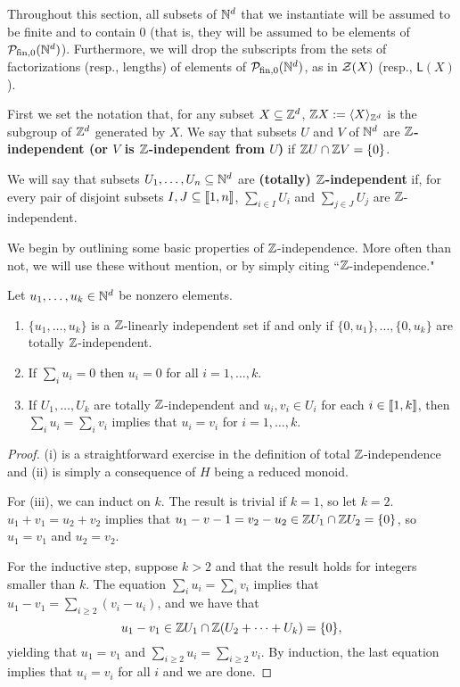 Throughout this section, all subsets of $\mathbb{N}^d$ that we instantiate will be assumed to be finite and to contain $0$ (that is, they will be assumed to be elements of $\mathcal{P}_{\textrm{fin}, 0}(\mathbb{N}^d)$).
Furthermore, we will drop the subscripts from the sets of factorizations (resp., lengths) of elements of $\mathcal{P}_{\textrm{fin}, 0}(\mathbb{N}^d)$, as in $\mathcal{Z}(X)$ (resp., $\mathsf{L}(X)$).

\begin{defn}
First we set the notation that, for any subset $X \subseteq \mathbb{Z}^d$, $\mathbb{Z} X := \langle X \rangle_{\mathbb{Z}^d}$ is the subgroup of $\mathbb{Z}^d$ generated by $X$.
We say that subsets $U$ and $V$ of $\mathbb{N}^d$ are \textbf{$\mathbb{Z}$-independent (or $V$ is $\mathbb{Z}$-independent from $U$)} if $\mathbb{Z} U \cap \mathbb{Z} V = \{0\}$.

We will say that subsets $U_1,\dots, U_n\subseteq \mathbb{N}^d$ are \textbf{(totally) $\mathbb{Z}$-independent} if, for every pair of disjoint subsets $I,J\subseteq\llbracket 1,n \rrbracket$, $\sum_{i\in I} U_i$ and $\sum_{j\in J} U_j$ are $\mathbb{Z}$-independent.
\end{defn}

We begin by outlining some basic properties of $\mathbb{Z}$-independence.  
More often than not, we will use these without mention, or by simply citing ``$\mathbb{Z}$-independence."
\begin{prop} \label{prop:eltwise-indep}
Let $u_1,\dots, u_k\in \mathbb{N}^d$ be nonzero elements.
\begin{enumerate}[label={\rm (\roman{*})}]
	\item $\{u_1,\dots,u_k\}$ is a $\mathbb{Z}$-linearly independent set if and only if $\{0,u_1\},\dots,\{0,u_k\}$ are totally $\mathbb{Z}$-independent.
	
	\item If $\sum_i u_i = 0$ then $u_i = 0$ for all $i=1,\dots, k$.
	
	\item If $U_1,\dots, U_k$ are totally $\mathbb{Z}$-independent and $u_i, v_i\in U_i$ for each $i\in \llbracket 1,k \rrbracket$,
	then $\sum_i u_i = \sum_i v_i$ implies that $u_i = v_i$ for $i = 1,\dots, k$.
\end{enumerate}
\end{prop}

\begin{proof}
(i) is a straightforward exercise in the definition of total $\mathbb{Z}$-independence and (ii) is simply a consequence of $H$ being a reduced monoid.

For (iii), we can induct on $k$.
The result is trivial if $k = 1$, so let $k=2$.
$u_1 + v_1 = u_2 + v_2$ implies that $u_1 - v-1 = v_2 - u_2 \in \mathbb{Z} U_1 \cap \mathbb{Z} U_2 = \{0\}$, so $u_1 = v_1$ and $u_2 = v_2$.

For the inductive step, suppose $k>2$ and that the result holds for integers smaller than $k$.
The equation $\sum_i u_i = \sum_i v_i$ implies that $u_1 - v_1 = \sum_{i\ge 2} (v_i - u_i)$, and we have that 
\[u_1 - v_1 \in \mathbb{Z} U_1 \cap \mathbb{Z}(U_2+\cdots+U_k) = \{0\},\]
yielding that $u_1 = v_1$ and $\sum_{i\ge 2} u_i = \sum_{i\ge 2} v_i$.
By induction, the last equation implies that $u_i = v_i$ for all $i$ and we are done.
\end{proof}

